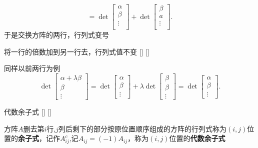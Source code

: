 \documentclass[UTF8]{ctexart}
\begin{document}
\begin{prf}
    \[
    = \det  \begin{bmatrix}
        \alpha \\
        \beta\\
        \vdots  \\
    
    \end{bmatrix} 
    + \det \begin{bmatrix}
    \beta  \\
        a \\
        \vdots \\
        
    \end{bmatrix} .
    \]
    于是交换方阵的两行，行列式变号
    \end{prf}

    \begin{crl}
			[]
			{将一行的倍数加到另一行去，行列式值不变}
			[]
			[]

    \end{crl}
    \begin{prf}
    同样以前两行为例
    \[  \det
    \begin{bmatrix}
    \alpha+\lambda\beta \\
    \beta \\
    \vdots
    \end{bmatrix}=\det
    \begin{bmatrix}
    \alpha \\
    \beta \\
    \vdots
    \end{bmatrix}+\lambda\det
    \begin{bmatrix}
    \beta \\
    \beta \\
    \vdots
    \end{bmatrix}=\det
    \begin{bmatrix}
    \alpha \\
    \beta \\
    \vdots
    \end{bmatrix}.\]
    \end{prf}

    \begin{dfn}
			[]
			{代数余子式}
			[]
			[]
 
	    方阵$A$删去第$i$行,$j$列后剩下的部分按原位置顺序组成的方阵的行列式称为$(i,j)$位置的\textbf{余子式}，记作$A_{ij}^{c}$,记$A_{ij}=(-1)A_{ij}$，称为$(i,j)$位置的\textbf{代数余子式}
	\end{dfn}
\end{document}
